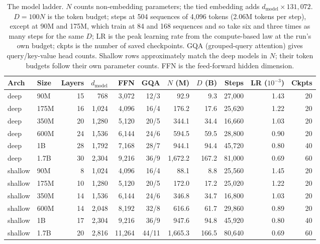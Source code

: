 \begin{table}[t]
\centering
\small
\setlength{\tabcolsep}{3.5pt}
\caption{The model ladder. $N$ counts non-embedding parameters; the tied embedding adds $d_{\mathrm{model}} \times 131{,}072$. $D = 100N$ is the token budget; steps at 504 sequences of 4,096 tokens (2.06M tokens per step), except at 90M and 175M, which train at 84 and 168 sequences and so take six and three times as many steps for the same $D$; LR is the peak learning rate from the compute-based law at the run's own budget; ckpts is the number of saved checkpoints. GQA (grouped-query attention) gives query/key-value head counts. Shallow rows approximately match the deep models in $N$; their token budgets follow their own parameter counts. FFN is the feed-forward hidden dimension.}
\label{tab:ladder}
\begin{tabular}{llrrrrrrrrr}
\toprule
Arch & Size & Layers & $d_{\mathrm{model}}$ & FFN & GQA & $N$ (M) & $D$ (B) & Steps & LR ($10^{-3}$) & Ckpts \\
\midrule
deep & 90M  & 15 &  768 & 3,072 & 12/3  &   92.9 &   9.3 & 27,000 & 1.43 & 20 \\
deep & 175M & 16 & 1,024 & 4,096 & 16/4  &  176.2 &  17.6 & 25,620 & 1.22 & 20 \\
deep & 350M & 20 & 1,280 & 5,120 & 20/5  &  344.1 &  34.4 & 16,660 & 1.03 & 20 \\
deep & 600M & 24 & 1,536 & 6,144 & 24/6  &  594.5 &  59.5 & 28,800 & 0.90 & 20 \\
deep & 1B   & 28 & 1,792 & 7,168 & 28/7  &  944.1 &  94.4 & 45,720 & 0.80 & 40 \\
deep & 1.7B & 30 & 2,304 & 9,216 & 36/9  & 1,672.2 & 167.2 & 81,000 & 0.69 & 60 \\
\midrule
shallow & 90M  &  8 & 1,024 &  4,096 & 16/4  &   88.1 &   8.8 & 25,560 & 1.45 & 20 \\
shallow & 175M & 10 & 1,280 &  5,120 & 20/5  &  172.0 &  17.2 & 25,020 & 1.22 & 20 \\
shallow & 350M & 14 & 1,536 &  6,144 & 24/6  &  346.8 &  34.7 & 16,800 & 1.03 & 20 \\
shallow & 600M & 14 & 2,048 &  8,192 & 32/8  &  616.6 &  61.7 & 29,860 & 0.89 & 20 \\
shallow & 1B   & 17 & 2,304 &  9,216 & 36/9  &  947.6 &  94.8 & 45,920 & 0.80 & 40 \\
shallow & 1.7B & 20 & 2,816 & 11,264 & 44/11 & 1,665.3 & 166.5 & 80,640 & 0.69 & 60 \\
\bottomrule
\end{tabular}
\end{table}

